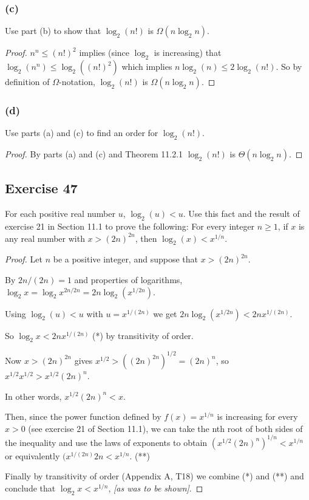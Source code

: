 \documentclass[14pt]{extarticle}
\begin{document}
\subsubsection{(c)}
Use part (b) to show that \(\log_2(n!)\) is \(\Omega(n\log_2 n)\).

\begin{proof}
    \(n^n \leq (n!)^2\) implies (since \(\log_2\) is increasing) that \(\log_2(n^n) \leq \log_2((n!)^2)\) which implies
    \(n\log_2(n) \leq 2\log_2(n!)\). So by definition of \(\Omega\)-notation, \(\log_2(n!)\) is \(\Omega(n\log_2 n)\).
\end{proof}

\subsubsection{(d)}
Use parts (a) and (c) to find an order for \(\log_2(n!)\).
\begin{proof}
    By parts (a) and (c) and Theorem 11.2.1 \(\log_2(n!)\) is \(\Theta(n\log_2 n)\).
\end{proof}

\subsection{Exercise 47}
For each positive real number \(u\), \(\log_2(u) < u\). Use this fact and the result of exercise 21 in Section 11.1 to
prove the following: For every integer \(n \geq 1\), if \(x\) is any real number with \(x > (2n)^{2n}\), then
\(\log_2(x) < x^{1/n}\).

\begin{proof}
    Let \(n\) be a positive integer, and suppose that \(x > (2n)^{2n}\).

    By \(2n / (2n) = 1\) and properties of logarithms, \(\log_2 x = \log_2 x^{2n/2n} = 2n \log_2 (x^{1/2n})\).

    Using \(\log_2(u) < u\) with \(u = x^{1/(2n)}\) we get \(2n \log_2 (x^{1/2n}) < 2nx^{1/(2n)}\).

    So \(\log_2 x < 2nx^{1/(2n)}\) (*) by transitivity of order.

    Now \(x > (2n)^{2n}\) gives \(x^{1/2} > ((2n)^{2n})^{1/2} = (2n)^n\), so \(x^{1/2}x^{1/2} > x^{1/2}(2n)^n\).

    In other words, \(x^{1/2}(2n)^n < x\).

    Then, since the power function defined by \(f(x) = x^{1/n}\) is increasing for every \(x > 0\) (see exercise 21 of Section
    11.1), we can take the nth root of both sides of the inequality and use the laws of exponents to obtain
    \((x^{1/2}(2n)^n)^{1/n} < x^{1/n}\) or equivalently \((x^{1/(2n)}2n < x^{1/n}\). (**)

    Finally by transitivity of order (Appendix A, T18) we combine (*) and (**) and conclude that \(\log_2 x < x^{1/n}\),
    {\it [as was to be shown]}.
\end{proof}
\end{document}
